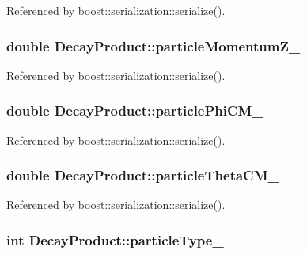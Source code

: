 Referenced by boost\-::serialization\-::serialize().

\hypertarget{classDecayProduct_ae66ea18cdf5326506410db0fd938a10e}{
\subsubsection[{particle\-Momentum\-Z\-\_\-}]{\setlength{\rightskip}{0pt plus 5cm}double Decay\-Product\-::particle\-Momentum\-Z\-\_\-}}\label{classDecayProduct_ae66ea18cdf5326506410db0fd938a10e}


Referenced by boost\-::serialization\-::serialize().

\hypertarget{classDecayProduct_aa0c105dd348ccba325596088a4116bfb}{
\subsubsection[{particle\-Phi\-C\-M\-\_\-}]{\setlength{\rightskip}{0pt plus 5cm}double Decay\-Product\-::particle\-Phi\-C\-M\-\_\-}}\label{classDecayProduct_aa0c105dd348ccba325596088a4116bfb}


Referenced by boost\-::serialization\-::serialize().

\hypertarget{classDecayProduct_ae06d6475e1134adeb1c8bd44cb2e651a}{
\subsubsection[{particle\-Theta\-C\-M\-\_\-}]{\setlength{\rightskip}{0pt plus 5cm}double Decay\-Product\-::particle\-Theta\-C\-M\-\_\-}}\label{classDecayProduct_ae06d6475e1134adeb1c8bd44cb2e651a}


Referenced by boost\-::serialization\-::serialize().

\hypertarget{classDecayProduct_ab567df06fabfa13a502d37b0e4116f6c}{
\subsubsection[{particle\-Type\-\_\-}]{\setlength{\rightskip}{0pt plus 5cm}int Decay\-Product\-::particle\-Type\-\_\-}}\label{classDecayProduct_ab567df06fabfa13a502d37b0e4116f6c}


